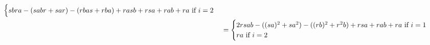 \begin{example}
\begin{itemize}
$$\begin{aligned}
\begin{cases}
                                \text{$
                                    sbra
                                    - (sabr + sar)
                                    - (rbas + rba)
                                    + rasb + rsa + rab + ra
                                $ if $i = 2$}
                            \end{cases}
                            \\
                            & = 
                            \begin{cases}
                                \text{$2 rsab - ( (sa)^2 + s a^2 ) - ( (rb)^2 + r^2 b ) + rsa + rab + ra$ if $i = 1$}
                                \\
                                \text{$ra$ if $i = 2$}
                            \end{cases}
                        \end{aligned}
                    $$
                

\end{itemize}
\end{example}
